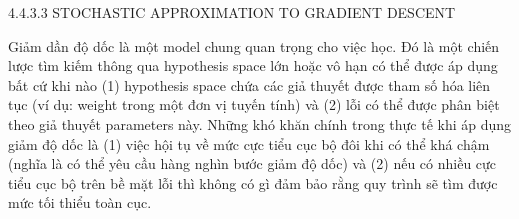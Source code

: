 4.4.3.3 STOCHASTIC APPROXIMATION TO GRADIENT DESCENT

Giảm dần độ dốc là một model chung quan trọng cho việc học. Đó là một chiến lược tìm kiếm thông qua hypothesis space lớn hoặc vô hạn có thể được áp dụng bất cứ khi nào (1) hypothesis space chứa các giả thuyết được tham số hóa liên tục (ví dụ: weight trong một đơn vị tuyến tính) và (2) lỗi có thể được phân biệt theo giả thuyết parameters này. Những khó khăn chính trong thực tế khi áp dụng giảm độ dốc là (1) việc hội tụ về mức cực tiểu cục bộ đôi khi có thể khá chậm (nghĩa là có thể yêu cầu hàng nghìn bước giảm độ dốc) và (2) nếu có nhiều cực tiểu cục bộ trên bề mặt lỗi thì không có gì đảm bảo rằng quy trình sẽ tìm được mức tối thiểu toàn cục.

